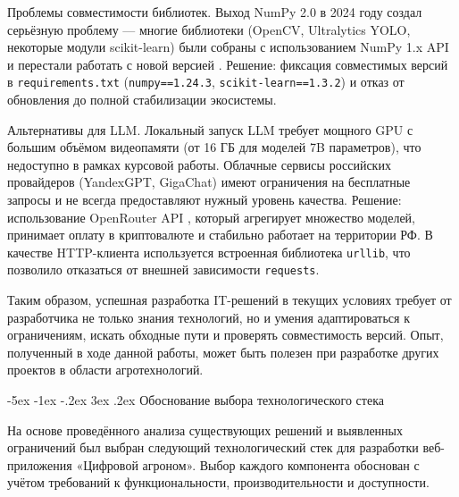 \documentclass[14pt, a4paper]{extarticle}
\makeatletter
\renewcommand\subsection{\@startsection {subsection}{2}{\z@}%
    {-5ex \@plus -1ex \@minus -.2ex}%
    {3ex \@plus.2ex}%
    {\centering\large\bfseries}}
\makeatother
\begin{document}
    Проблемы совместимости библиотек. Выход NumPy 2.0 в 2024 году создал серьёзную проблему — многие библиотеки (OpenCV, Ultralytics YOLO, некоторые модули scikit-learn) были собраны с использованием NumPy 1.x API и перестали работать с новой версией \cite{numpy}. Решение: фиксация совместимых версий в \texttt{requirements.txt} (\texttt{numpy==1.24.3}, \texttt{scikit-learn==1.3.2}) и отказ от обновления до полной стабилизации экосистемы.

    Альтернативы для LLM. Локальный запуск LLM требует мощного GPU с большим объёмом видеопамяти (от 16 ГБ для моделей 7B параметров), что недоступно в рамках курсовой работы. Облачные сервисы российских провайдеров (YandexGPT, GigaChat) имеют ограничения на бесплатные запросы и не всегда предоставляют нужный уровень качества. Решение: использование OpenRouter API \cite{openrouter}, который агрегирует множество моделей, принимает оплату в криптовалюте и стабильно работает на территории РФ. В качестве HTTP-клиента используется встроенная библиотека \texttt{urllib}, что позволило отказаться от внешней зависимости \texttt{requests}.

    Таким образом, успешная разработка IT-решений в текущих условиях требует от разработчика не только знания технологий, но и умения адаптироваться к ограничениям, искать обходные пути и проверять совместимость версий. Опыт, полученный в ходе данной работы, может быть полезен при разработке других проектов в области агротехнологий.

\subsection{Обоснование выбора технологического стека}

    На основе проведённого анализа существующих решений и выявленных ограничений был выбран следующий технологический стек для разработки веб-приложения «Цифровой агроном». Выбор каждого компонента обоснован с учётом требований к функциональности, производительности и доступности.
\end{document}
